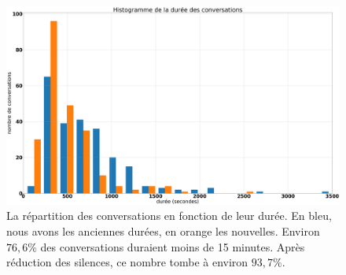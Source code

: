 \begin{figure}[h]
  \centering
  \includegraphics[width=15cm]{./Chapitre4/figures/repart.png}
  \caption{La répartition des conversations en fonction de leur durée. En bleu, nous avons les anciennes durées, en orange les nouvelles. Environ $76,6\%$ des conversations duraient moins de 15 minutes. Après réduction des silences, ce nombre tombe à environ $93,7\%$.}
  \label{fig:repart}
\end{figure}
